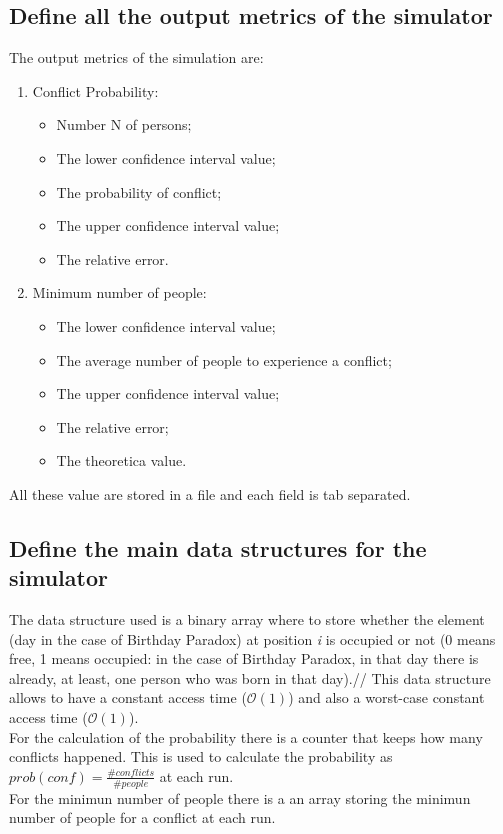 \documentclass{report}
\begin{document}
	\subsection{Define all the output metrics of the simulator}
			The output metrics of the simulation are:
			\begin{enumerate}
					\item Conflict Probability:
					\begin{itemize}
							\item Number N of persons;
							\item The lower confidence interval value;
							\item The probability of conflict;
							\item The upper confidence interval value;
							\item The relative error.
					\end{itemize}
					\item Minimum number of people:
					\begin{itemize}
							\item The lower confidence interval value;
							\item The average number of people to experience a conflict;
							\item The upper confidence interval value;
							\item The relative error;
							\item The theoretica value.
					\end{itemize}
			\end{enumerate}
			All these value are stored in a file and each field is tab separated.
	
	\subsection{Define the main data structures for the simulator}
				The data structure used is a binary array where to store whether the element (day in the case of Birthday Paradox) at position \emph{i} is occupied or not (0 means free, 1 means occupied: in the case of Birthday Paradox, in that day there is already, at least, one person who was born in that day).// This data structure allows to have a constant access time ($\mathcal{O}(1)$) and also a worst-case constant access time ($\mathcal{O}(1)$). \\
				For the calculation of the probability there is a counter that keeps how many conflicts happened. This is used to calculate the probability as $prob(conf)=\frac{\#conflicts}{\#people}$ at each run. \\
				For the minimun number of people there is a an array storing the minimun number of people for a conflict at each run.
			
\end{document}
